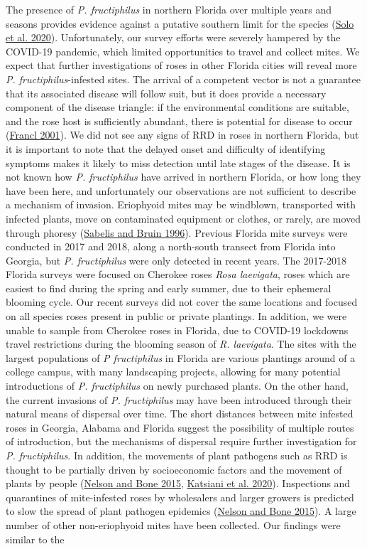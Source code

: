 \documentclass{ufdissertation}[overrideChapters] %
\begin{document}
{The presence of \emph{P. fructiphilus} in northern Florida over multiple years and seasons provides evidence against a putative southern limit for the species (\protect\hyperlink{ref-Solo2020}{Solo et al. 2020}). Unfortunately, our survey efforts were severely hampered by the COVID-19 pandemic, which limited opportunities to travel and collect mites. We expect that further investigations of roses in other Florida cities will reveal more \emph{P. fructiphilus}-infested sites. The arrival of a competent vector is not a guarantee that its associated disease will follow suit, but it does provide a necessary component of the disease triangle: if the environmental conditions are suitable, and the rose host is sufficiently abundant, there is potential for disease to occur (\protect\hyperlink{ref-Francl2001}{Francl 2001}). We did not see any signs of RRD in roses in northern Florida, but it is important to note that the delayed onset and difficulty of identifying symptoms makes it likely to miss detection until late stages of the disease. It is not known how \emph{P. fructiphilus} have arrived in northern Florida, or how long they have been here, and unfortunately our observations are not sufficient to describe a mechanism of invasion. Eriophyoid mites may be windblown, transported with infected plants, move on contaminated equipment or clothes, or rarely, are moved through phoresy (\protect\hyperlink{ref-Sabelis1996}{Sabelis and Bruin 1996}). Previous Florida mite surveys were conducted in 2017 and 2018, along a north-south transect from Florida into Georgia, but \emph{P. fructiphilus} were only detected in recent years. The 2017-2018 Florida surveys were focused on Cherokee roses \emph{Rosa laevigata}, roses which are easiest to find during the spring and early summer, due to their ephemeral blooming cycle. Our recent surveys did not cover the same locations and focused on all species roses present in public or private plantings. In addition, we were unable to sample from Cherokee roses in Florida, due to COVID-19 lockdowns travel restrictions during the blooming season of \emph{R. laevigata}. The sites with the largest populations of \emph{P fructiphilus} in Florida are various plantings around of a college campus, with many landscaping projects, allowing for many potential introductions of \emph{P. fructiphilus} on newly purchased plants. On the other hand, the current invasions of \emph{P. fructiphilus} may have been introduced through their natural means of dispersal over time. The short distances between mite infested roses in Georgia, Alabama and Florida suggest the possibility of multiple routes of introduction, but the mechanisms of dispersal require further investigation for \emph{P. fructiphilus}. In addition, the movements of plant pathogens such as RRD is thought to be partially driven by socioeconomic factors and the movement of plants by people (\protect\hyperlink{ref-Nelson2015}{Nelson and Bone 2015}, \protect\hyperlink{ref-Katsiani2020}{Katsiani et al. 2020}). Inspections and quarantines of mite-infested roses by wholesalers and larger growers is predicted to slow the spread of plant pathogen epidemics (\protect\hyperlink{ref-Nelson2015}{Nelson and Bone 2015}). A large number of other non-eriophyoid mites have been collected. Our findings were similar to the }
\end{document}
